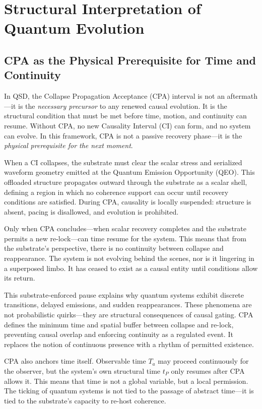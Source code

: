 \documentclass[preprints,article,submit,pdftex,moreauthors]{Definitions/mdpi}
\begin{document}
\section{Structural Interpretation of Quantum Evolution}
\subsection{CPA as the Physical Prerequisite for Time and Continuity}

In QSD, the Collapse Propagation Acceptance (CPA) interval is not an aftermath—it is the \emph{necessary precursor} to any renewed causal evolution. It is the structural condition that must be met before time, motion, and continuity can resume. Without CPA, no new Causality Interval (CI) can form, and no system can evolve. In this framework, CPA is not a passive recovery phase—it is the \emph{physical prerequisite for the next moment}.

When a CI collapses, the substrate must clear the scalar stress and serialized waveform geometry emitted at the Quantum Emission Opportunity (QEO). This offloaded structure propagates outward through the substrate as a scalar shell, defining a region in which no coherence support can occur until recovery conditions are satisfied. During CPA, causality is locally suspended: structure is absent, pacing is disallowed, and evolution is prohibited.

Only when CPA concludes—when scalar recovery completes and the substrate permits a new re-lock—can time resume for the system. This means that from the substrate’s perspective, there is no continuity between collapse and reappearance. The system is not evolving behind the scenes, nor is it lingering in a superposed limbo. It has ceased to exist as a causal entity until conditions allow its return.

This substrate-enforced pause explains why quantum systems exhibit discrete transitions, delayed emissions, and sudden reappearances. These phenomena are not probabilistic quirks—they are structural consequences of causal gating. CPA defines the minimum time and spatial buffer between collapse and re-lock, preventing causal overlap and enforcing continuity as a regulated event. It replaces the notion of continuous presence with a rhythm of permitted existence.

CPA also anchors time itself. Observable time \(T_a\) may proceed continuously for the observer, but the system’s own structural time \(t_P\) only resumes after CPA allows it. This means that time is not a global variable, but a local permission. The ticking of quantum systems is not tied to the passage of abstract time—it is tied to the substrate’s capacity to re-host coherence.
\end{document}
